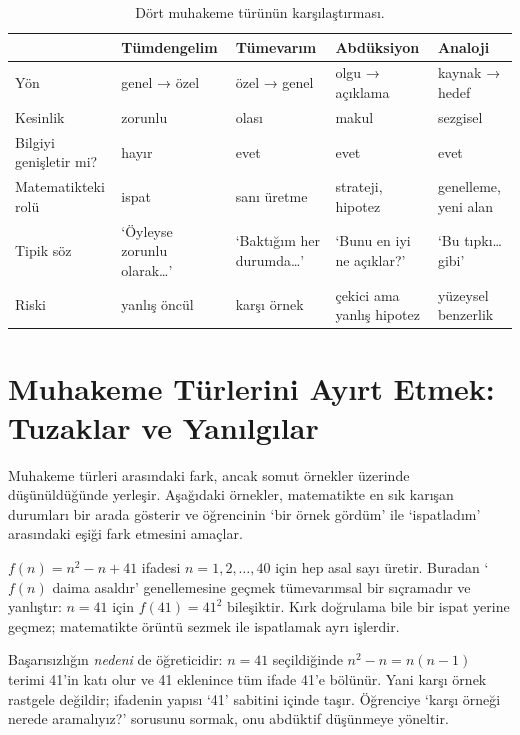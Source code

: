 \begin{table}[h]
\centering\small
\renewcommand{\arraystretch}{1.3}
\begin{tabularx}{\linewidth}{>{\raggedright\arraybackslash}p{2.3cm}>{\raggedright\arraybackslash}X>{\raggedright\arraybackslash}X>{\raggedright\arraybackslash}X>{\raggedright\arraybackslash}X}
\toprule
 & \textbf{Tüm\-dengelim} & \textbf{Tümevarım} & \textbf{Abdüksiyon} & \textbf{Analoji}\\
\midrule
Yön & genel → özel & özel → genel & olgu → açıklama & kaynak → hedef\\
Kesinlik & zorunlu & olası & makul & sezgisel\\
Bilgiyi genişletir mi? & hayır & evet & evet & evet\\
Matematikteki rolü & ispat & sanı üretme & strateji, hipotez & genelleme, yeni alan\\
Tipik söz & ‘Öyleyse zorunlu olarak…’ & ‘Baktığım her durumda…’ & ‘Bunu en iyi ne açıklar?’ & ‘Bu tıpkı… gibi’\\
Riski & yanlış öncül & karşı örnek & çekici ama yanlış hipotez & yüzeysel benzerlik\\
\bottomrule
\end{tabularx}
\caption{Dört muhakeme türünün karşılaştırması.}
\end{table}

\section{Muhakeme Türlerini Ayırt Etmek: Tuzaklar ve Yanılgılar}

Muhakeme türleri arasındaki fark, ancak somut örnekler üzerinde düşünüldüğünde yerleşir. Aşağıdaki örnekler, matematikte en sık karışan durumları bir arada gösterir ve öğrencinin ‘bir örnek gördüm’ ile ‘ispatladım’ arasındaki eşiği fark etmesini amaçlar.


\begin{ornek}
$f(n)=n^2-n+41$ ifadesi $n=1,2,\dots,40$ için hep asal sayı üretir. Buradan ‘$f(n)$ daima asaldır’ genellemesine geçmek tümevarımsal bir sıçramadır ve yanlıştır: $n=41$ için $f(41)=41^2$ bileşiktir. Kırk doğrulama bile bir ispat yerine geçmez; matematikte örüntü sezmek ile ispatlamak ayrı işlerdir.

\smallskip
Başarısızlığın \emph{nedeni} de öğreticidir: $n=41$ seçildiğinde $n^2-n=n(n-1)$ terimi 41’in katı olur ve 41 eklenince tüm ifade 41’e bölünür. Yani karşı örnek rastgele değildir; ifadenin yapısı ‘41’ sabitini içinde taşır. Öğrenciye ‘karşı örneği nerede aramalıyız?’ sorusunu sormak, onu abdüktif düşünmeye yöneltir.
\end{ornek}


